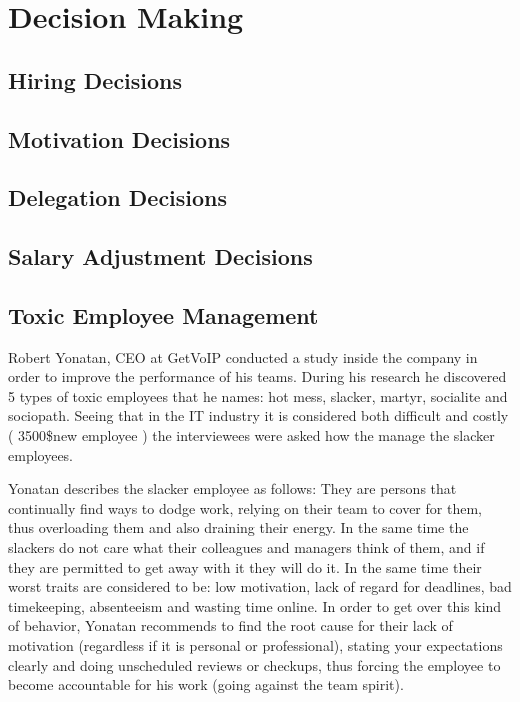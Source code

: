 \chapter{Decision Making}
\label{chapter:decision}
\section{Hiring Decisions}
\label{sec:hiring}
\section{Motivation Decisions}
\label{sec:motivation}
\section{Delegation Decisions}
\label{sec:delegation}
\section{Salary Adjustment Decisions}
\label{sec:salary}

\section{Toxic Employee Management}
\label{sec:toxic}

Robert Yonatan, CEO at GetVoIP conducted a study inside the company in order to improve the performance of his teams. During his research \cite{toxic} he discovered 5 types of toxic employees that he names: hot mess, slacker, martyr, socialite and sociopath. Seeing that in the IT industry it is considered both difficult and costly ( 3500\$new employee \cite{cost-replace}) the interviewees were asked how the manage the slacker employees.

Yonatan describes the slacker employee as follows: They are persons that continually find ways to dodge work, relying on their team to cover for them, thus overloading them and also draining their energy. In the same time the slackers do not care what their colleagues and managers think of them, and if they are permitted to get away with it they will do it. In the same time their worst traits are considered to be: low motivation, lack of regard for deadlines, bad timekeeping, absenteeism and wasting time online. In order to get over this kind of behavior, Yonatan recommends to find the root cause for their lack of motivation (regardless if it is personal or professional), stating your expectations clearly and doing unscheduled reviews or checkups, thus forcing the employee to become accountable for his work (going against the team spirit).

